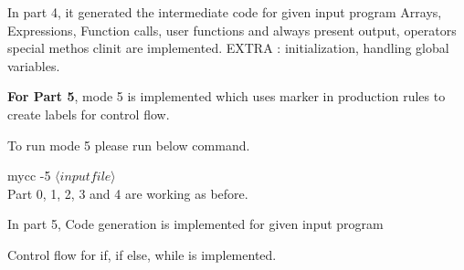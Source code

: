 \documentclass{article}
\begin{document}
In part 4, it generated the intermediate code for given input program
Arrays, Expressions, Function calls, user functions and always present output, operators
special methos clinit are implemented.
EXTRA :  initialization, handling global variables.

{ \bf  For Part 5}, mode 5 is implemented which uses marker in production rules to create labels for control flow. 

To run mode 5 please run below command.

mycc -5 $\langle input file\rangle$ \\

Part 0, 1, 2, 3 and 4 are working as before.

In part 5,  Code generation is implemented for given input program

Control flow for if, if else, while is implemented. 
\end{document}
